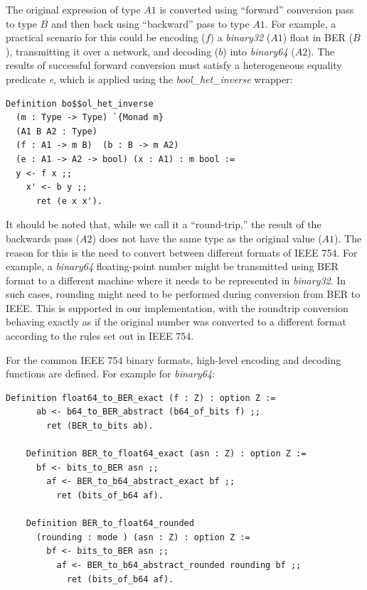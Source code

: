 \documentclass[sigplan]{acmart}
\begin{document}
The original expression of type $A1$ is converted using ``forward'' conversion
pass to type $B$ and then back using ``backward'' pass to type $A1$. For example, a practical scenario
for this could be encoding ($f$) a \emph{binary32} ($A1$) float in BER ($B$), transmitting it over a
network, and decoding ($b$) into \emph{binary64} ($A2$). The results
of successful forward conversion must satisfy a heterogeneous equality
predicate \emph{e}, which is applied using the \emph{bool\_het\_inverse} wrapper:

\begin{lstlisting}[language=Coq, mathescape=true,
  basicstyle=\footnotesize]
Definition bo$$ol_het_inverse
  (m : Type -> Type) `{Monad m}
  (A1 B A2 : Type)
  (f : A1 -> m B)  (b : B -> m A2)
  (e : A1 -> A2 -> bool) (x : A1) : m bool := 
  y <- f x ;;
    x' <- b y ;;
      ret (e x x').
\end{lstlisting}

It should be noted that, while we call it a ``round-trip,'' the result
of the backwards pass ($A2$) does not have the same type as the original value ($A1$).
The reason for this is the need to convert between different formats of IEEE 754. For
example, a \emph{binary64} floating-point number might be transmitted using BER format
to a different machine where it needs to be represented in \emph{binary32}.
In such cases, rounding might need to be performed during conversion from BER to IEEE.
This is supported in our implementation, with the roundtrip conversion behaving exactly as if the
original number was converted to a different format according to the rules set out in IEEE 754.

For the common IEEE 754 binary formats, high-level encoding and decoding functions are defined.
For example for \emph{binary64}:

\begin{lstlisting}[language=Coq, mathescape=true,
  basicstyle=\footnotesize]
    Definition float64_to_BER_exact (f : Z) : option Z :=
      ab <- b64_to_BER_abstract (b64_of_bits f) ;;
        ret (BER_to_bits ab).

    Definition BER_to_float64_exact (asn : Z) : option Z :=
      bf <- bits_to_BER asn ;;
        af <- BER_to_b64_abstract_exact bf ;;
          ret (bits_of_b64 af).

    Definition BER_to_float64_rounded
      (rounding : mode ) (asn : Z) : option Z :=
        bf <- bits_to_BER asn ;;
          af <- BER_to_b64_abstract_rounded rounding bf ;;
            ret (bits_of_b64 af).
\end{lstlisting}
\end{document}

